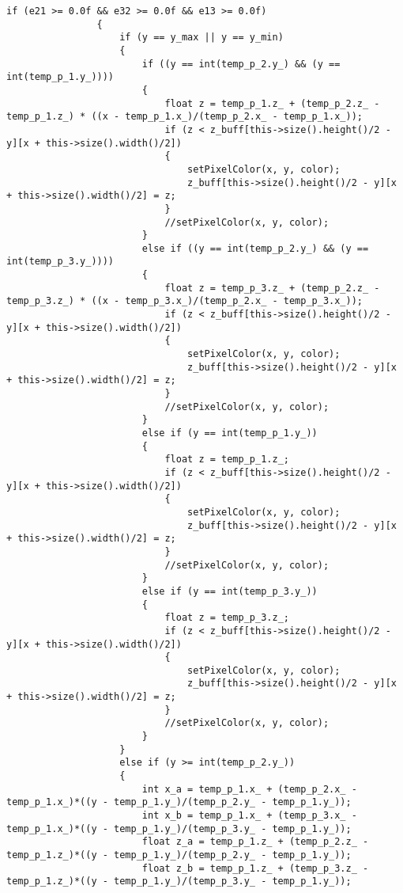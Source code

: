 \begin{lstlisting}[caption = Реализация общего алгоритма отрисовки, label = lst:zbuf]
                if (e21 >= 0.0f && e32 >= 0.0f && e13 >= 0.0f)
                {
                    if (y == y_max || y == y_min)
                    {
                        if ((y == int(temp_p_2.y_) && (y == int(temp_p_1.y_))))
                        {
                            float z = temp_p_1.z_ + (temp_p_2.z_ - temp_p_1.z_) * ((x - temp_p_1.x_)/(temp_p_2.x_ - temp_p_1.x_));
                            if (z < z_buff[this->size().height()/2 - y][x + this->size().width()/2])
                            {
                                setPixelColor(x, y, color);
                                z_buff[this->size().height()/2 - y][x + this->size().width()/2] = z;
                            }
                            //setPixelColor(x, y, color);
                        }
                        else if ((y == int(temp_p_2.y_) && (y == int(temp_p_3.y_))))
                        {
                            float z = temp_p_3.z_ + (temp_p_2.z_ - temp_p_3.z_) * ((x - temp_p_3.x_)/(temp_p_2.x_ - temp_p_3.x_));
                            if (z < z_buff[this->size().height()/2 - y][x + this->size().width()/2])
                            {
                                setPixelColor(x, y, color);
                                z_buff[this->size().height()/2 - y][x + this->size().width()/2] = z;
                            }
                            //setPixelColor(x, y, color);
                        }
                        else if (y == int(temp_p_1.y_))
                        {
                            float z = temp_p_1.z_;
                            if (z < z_buff[this->size().height()/2 - y][x + this->size().width()/2])
                            {
                                setPixelColor(x, y, color);
                                z_buff[this->size().height()/2 - y][x + this->size().width()/2] = z;
                            }
                            //setPixelColor(x, y, color);
                        }
                        else if (y == int(temp_p_3.y_))
                        {
                            float z = temp_p_3.z_;
                            if (z < z_buff[this->size().height()/2 - y][x + this->size().width()/2])
                            {
                                setPixelColor(x, y, color);
                                z_buff[this->size().height()/2 - y][x + this->size().width()/2] = z;
                            }
                            //setPixelColor(x, y, color);
                        }
                    }
                    else if (y >= int(temp_p_2.y_))
                    {
                        int x_a = temp_p_1.x_ + (temp_p_2.x_ - temp_p_1.x_)*((y - temp_p_1.y_)/(temp_p_2.y_ - temp_p_1.y_));
                        int x_b = temp_p_1.x_ + (temp_p_3.x_ - temp_p_1.x_)*((y - temp_p_1.y_)/(temp_p_3.y_ - temp_p_1.y_));
                        float z_a = temp_p_1.z_ + (temp_p_2.z_ - temp_p_1.z_)*((y - temp_p_1.y_)/(temp_p_2.y_ - temp_p_1.y_));
                        float z_b = temp_p_1.z_ + (temp_p_3.z_ - temp_p_1.z_)*((y - temp_p_1.y_)/(temp_p_3.y_ - temp_p_1.y_));


\end{lstlisting}
